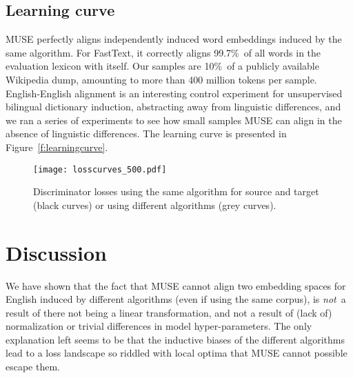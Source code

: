 \documentclass[11pt,a4paper]{article}
\begin{document}
\subsection{Learning curve}

MUSE perfectly aligns independently induced word embeddings induced by the same algorithm. For FastText, it correctly aligns 99.7\%~of all words in the evaluation lexicon with itself. Our samples are 10\%~of a publicly available Wikipedia dump, amounting to more than 400 million tokens per sample. English-English alignment is an interesting control experiment for unsupervised bilingual dictionary induction, abstracting away from linguistic differences, and we ran a series of experiments to see how small samples MUSE can align in the absence of linguistic differences. The learning curve is presented in Figure~\ref{f:learningcurve}. 

\begin{figure}
\texttt{[image: losscurves\_500.pdf]}
\caption{Discriminator losses using the same algorithm for source and target (black curves) or using different algorithms (grey curves).}\label{f:losses}
\end{figure}







\section{Discussion}

We have shown that the fact that MUSE cannot align two embedding spaces for English induced by different algorithms (even if using the same corpus), is {\em not}~a result of there not being a linear transformation, and not a result of (lack of) normalization or trivial differences in model hyper-parameters. The only explanation left seems to be that the inductive biases of the different algorithms lead to a loss landscape so riddled with local optima that MUSE cannot possible escape them. 
\end{document}

